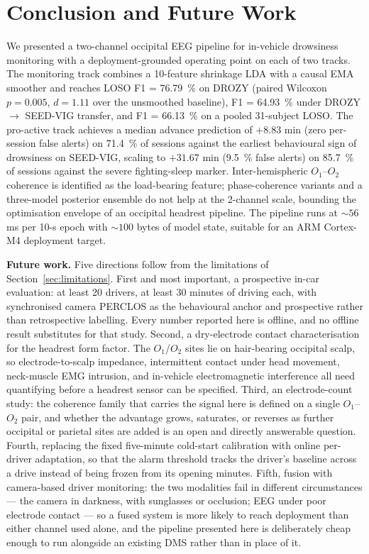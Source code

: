 \documentclass[journal]{IEEEtran}
\DeclareRobustCommand{\add}[1]{#1}                         %
\DeclareRobustCommand{\del}[1]{}                           %
\DeclareRobustCommand{\add}[1]{\hl{#1}}
\DeclareRobustCommand{\del}[1]{{\color{delred}\sout{#1}}\,}
\DeclareRobustCommand{\del}[1]{}                         %
\DeclareRobustCommand{\chg}[2]{\del{#1}\add{#2}}
\begin{document}
\section{\chg{Conclusion}{Conclusion and Future Work}}
\label{sec:conclusion}
We presented a two-channel occipital EEG pipeline for in-vehicle drowsiness monitoring with a deployment-grounded operating point on each of two tracks. The monitoring track combines a 10-feature shrinkage LDA with a causal EMA smoother and reaches LOSO F1 = 76.79~\% on DROZY (paired Wilcoxon \(p = 0.005\), \(d = 1.11\) over the unsmoothed baseline), F1 = 64.93~\% under DROZY \(\to\) SEED-VIG transfer, and F1 = 66.13~\% on a pooled 31-subject LOSO. The pro-active track achieves a median advance prediction of \(+8.83\) min (zero per-session false alerts) on 71.4~\% of sessions against the earliest behavioural sign of drowsiness on SEED-VIG, scaling to \(+31.67\) min (9.5~\% false alerts) on 85.7~\% of sessions against the severe fighting-sleep marker. Inter-hemispheric \(O_1\)--\(O_2\) coherence is identified as the load-bearing feature; phase-coherence variants and a three-model posterior ensemble do not help at the 2-channel scale, bounding the optimisation envelope of an occipital headrest pipeline. The pipeline runs at \(\sim 56\) ms per 10-s epoch with \(\sim 100\) bytes of model state, suitable for an ARM Cortex-M4 deployment target.

\add{\textbf{Future work.} Five directions follow from the limitations of Section~\mbox{\ref{sec:limitations}}. First and most important, a prospective in-car evaluation: at least 20 drivers, at least 30 minutes of driving each, with synchronised camera PERCLOS as the behavioural anchor and prospective rather than retrospective labelling. Every number reported here is offline, and no offline result substitutes for that study. Second, a dry-electrode contact characterisation for the headrest form factor. The \mbox{\(O_1\)}/\mbox{\(O_2\)} sites lie on hair-bearing occipital scalp, so electrode-to-scalp impedance, intermittent contact under head movement, neck-muscle EMG intrusion, and in-vehicle electromagnetic interference all need quantifying before a headrest sensor can be specified. Third, an electrode-count study: the coherence family that carries the signal here is defined on a single \mbox{\(O_1\)}--\mbox{\(O_2\)} pair, and whether the advantage grows, saturates, or reverses as further occipital or parietal sites are added is an open and directly answerable question. Fourth, replacing the fixed five-minute cold-start calibration with online per-driver adaptation, so that the alarm threshold tracks the driver's baseline across a drive instead of being frozen from its opening minutes. Fifth, fusion with camera-based driver monitoring: the two modalities fail in different circumstances --- the camera in darkness, with sunglasses or occlusion; EEG under poor electrode contact --- so a fused system is more likely to reach deployment than either channel used alone, and the pipeline presented here is deliberately cheap enough to run alongside an existing DMS rather than in place of it.}
\end{document}
